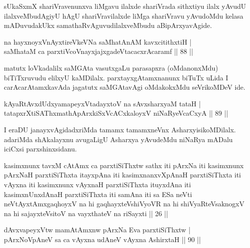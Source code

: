 \begin{artha}
sUkaSxmX shariVravenunxva liMgavu ilalxde shariVrada sithxtiyu ilalx yAvudU ilalxveMbudAgiyU hAgU shariVravilalxde liMga shariVravu yAvudoMdu kelasa mADuvudakUkx samathaRvAguvudilalxveMbudu aBipArxyavAgide.
\end{artha}

\begin{shl}
na hayxnoyxVnAyxtireVkeVNa saMhatAnAM kavxcitithxtiH |\\
saMhataM ca parxtiVcoV\s nayxjajxgadeVtacacxrAcaramf \hfill || 88 ||
\end{shl}

\begin{artha}
matutx loVkadalilx saMGAta vasutxgaLu parasapxra (oMdanonxMdu) biTiTxruvudu elilxyU kaMDilalx. parxtayxgAtamxnanunx biTuTx uLida I carAcarAtamxkavAda jagatutx saMGAtavAgi oMdakokxMdu seVrikoMDeV ide.
\end{artha}


\begin{shl}
kAyaRtAvxdUdxyamapeyxVtadayxtoV na sAvxsharxyaM tataH |\\
tatapxrXtiSAThxmathApArxkiSxVcACxkaloyxV niNaRyeVcaCxyA \hfill || 89 ||
\end{shl}

\begin{artha}
I eraDU janayxvAgidadxriMda tamamx tamamxneVnx AsharxyisikoMDilalx. adariMda shAkalayxnu avugaLigU Asharxya yAvudeMdu niNaRya mADalu iciCxsi parxshinxsidanu.
\end{artha}%


\begin{kandikeshl}
kasimxnunx tavxM cAtAmx ca parxtiSiThxtw sathx iti pArxNa iti kasimxnunx pArxNaH parxtiSiThxta itayxpAna iti kasimxnanxvXpAnaH parxtiSiThxta iti vAyxna iti kasimxnunx vAyxnaH parxtiSiThxta ituyxdAna iti kasimxnUnxdAnaH parxtiSiThxta iti samAna iti sa ESa neVti neVtAyxtAmxgaqhoyxV na hi gaqhayxteV\s shiVyoVR na hi shiVyaRteV\s saknogxV na hi sajayxteV\s sitoV na vayxthateV na riSayxti || 26 ||
\end{kandikeshl}

\begin{shl}
dAvxvapeyxVtw mamA\s \s tAmxnw pArxNa Eva parxtiSiThxtw |\\
pArxNoV\s pAneV sa ca vAyxna udAneV vAyxna AshirxtaH \hfill || 90 ||
\end{shl}

